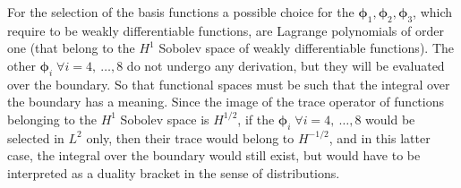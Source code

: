 \documentclass[preprint,12pt]{elsarticle}
\begin{document}
For the selection of the basis functions a possible choice for the $\bm{\phi}_1, \bm{\phi}_2, \bm{\phi}_3$, which require to be weakly differentiable functions, are Lagrange polynomials of order one (that belong to the $H^1$ Sobolev space of weakly differentiable functions). The other $\bm{\phi}_i \; \forall i=4,\ \dots, 8$ do not undergo any derivation, but they will be evaluated over the boundary. So that functional spaces must be such that the integral over the boundary has a meaning. Since the image of the trace operator of functions belonging to the $H^1$ Sobolev space is  $H^{1/2}$, if the $\bm{\phi}_i \; \forall i=4,\ \dots, 8$ would be selected in $L^2$ only, then their trace would belong to $H^{-1/2}$, and in this latter case, the integral over the boundary would still exist, but would have to be interpreted as a duality bracket in the sense of distributions.
\end{document}
